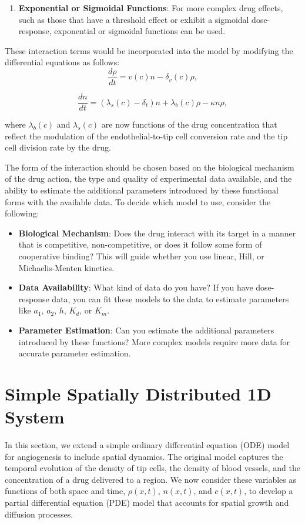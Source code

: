 \begin{enumerate}
	\item \textbf{Exponential or Sigmoidal Functions}: For more complex drug effects, such as those that have a threshold effect or exhibit a sigmoidal dose-response, exponential or sigmoidal functions can be used.
\end{enumerate}

These interaction terms would be incorporated into the model by modifying the differential equations as follows:
\[
\frac{d\rho}{dt} = v(c)n - \delta_v(c) \rho,
\]

\[
\frac{dn}{dt} = (\lambda_s(c) - \delta_t) n + \lambda_b(c) \rho - \kappa n \rho,
\]

where \( \lambda_b(c) \) and \( \lambda_s(c) \) are now functions of the drug concentration that reflect the modulation of the endothelial-to-tip cell conversion rate and the tip cell division rate by the drug.

The form of the interaction should be chosen based on the biological mechanism of the drug action, the type and quality of experimental data available, and the ability to estimate the additional parameters introduced by these functional forms with the available data.
To decide which model to use, consider the following:

\begin{itemize}
	\item \textbf{Biological Mechanism}: Does the drug interact with its target in a manner that is competitive, non-competitive, or does it follow some form of cooperative binding? This will guide whether you use linear, Hill, or Michaelis-Menten kinetics.
	\item \textbf{Data Availability}: What kind of data do you have? If you have dose-response data, you can fit these models to the data to estimate parameters like \( a_1 \), \( a_2 \), \( h \), \( K_d \), or \( K_m \).
	\item \textbf{Parameter Estimation}: Can you estimate the additional parameters introduced by these functions? More complex models require more data for accurate parameter estimation.
\end{itemize}



\section{Simple Spatially Distributed 1D System}


In this section, we extend a simple ordinary differential equation (ODE) model for angiogenesis to include spatial dynamics. The original model captures the temporal evolution of the density of tip cells, the density of blood vessels, and the concentration of a drug delivered to a region. We now consider these variables as functions of both space and time, \(\rho(x,t)\), \(n(x,t)\), and \(c(x,t)\), to develop a partial differential equation (PDE) model that accounts for spatial growth and diffusion processes.

